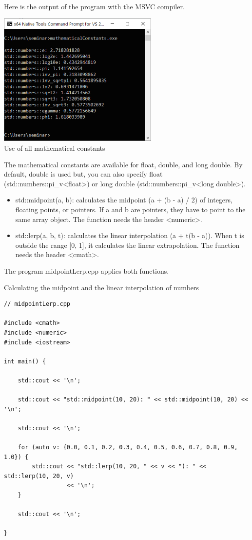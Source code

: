 Here is the output of the program with the MSVC compiler.

\begin{center}
\includegraphics[width=0.6\textwidth]{content/3/chapter5/images/17.png}\\
Use of all mathematical constants
\end{center}

The mathematical constants are available for float, double, and long double. By default, double is used but, you can also specify float (std::numbers::pi\_v<float>) or long double (std::numbers::pi\_v<long double>).


\begin{itemize}
\item 
std::midpoint(a, b): calculates the midpoint (a + (b - a) / 2) of integers, floating points, or pointers. If a and b are pointers, they have to point to the same array object. The function needs the header <numeric>.

\item 
std::lerp(a, b, t): calculates the linear interpolation (a + t(b - a)). When t is outside the range [0, 1], it calculates the linear extrapolation. The function needs the header <cmath>.
\end{itemize}

The program midpointLerp.cpp applies both functions.

\noindent
Calculating the midpoint and the linear interpolation of numbers
\begin{lstlisting}[style=styleCXX]
// midpointLerp.cpp

#include <cmath>
#include <numeric>
#include <iostream>

int main() {
	
	std::cout << '\n';
	
	std::cout << "std::midpoint(10, 20): " << std::midpoint(10, 20) << '\n';
	
	std::cout << '\n';
	
	for (auto v: {0.0, 0.1, 0.2, 0.3, 0.4, 0.5, 0.6, 0.7, 0.8, 0.9, 1.0}) {
		std::cout << "std::lerp(10, 20, " << v << "): " << std::lerp(10, 20, v)
				  << '\n';
	}
	
	std::cout << '\n';
	
}
\end{lstlisting}

